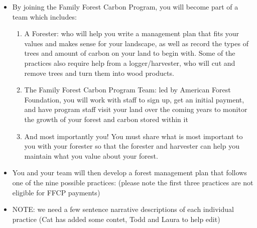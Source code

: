 \documentclass{article}\usepackage[]{graphicx}\usepackage[]{color}
\begin{document}
\begin{itemize}
  \begin{centering}   
\end{centering}
  
  \item By joining the Family Forest Carbon Program, you will become part of a team which includes: 
    \begin{enumerate}
    \item A Forester: who will help you write a management plan that fits your values and makes sense for your landscape, as well as record the types of trees and amount of carbon on your land to begin with. Some of the practices also require help from a logger/harvester, who will cut and remove trees and turn them into wood products.
    \item The Family Forest Carbon Program Team: led by American Forest Foundation, you will work with staff to sign up, get an initial payment, and have program staff visit your land over the coming years to monitor the growth of your forest and carbon stored within it
    \item And most importantly you! You must share what is most important to you with your forester so that the forester and harvester can help you maintain what you value about your forest. 
    \end{enumerate}

  \item You and your team will then develop a forest management plan that follows one of the nine possible practices: (please note the first three practices are not eligible for FFCP payments)
  \item NOTE: we need a few sentence narrative descriptions of each individual practice (Cat has added some contet, Todd and Laura to help edit)


\end{itemize}
\end{document}
